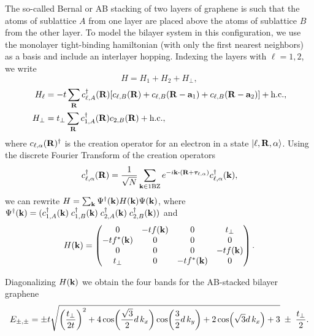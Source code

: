 \documentclass[12pt]{report}
\begin{document}
The so-called Bernal or AB stacking of two layers of graphene is such that the atoms of sublattice $A$ from one layer are placed above the atoms of sublattice $B$ from the other layer.
To model the bilayer system in this configuration, we use the monolayer tight-binding hamiltonian (with only the first
nearest neighbors) as a basis and include an interlayer hopping. Indexing the layers with $\ell = 1, 2$, we write
\begin{equation} \label{eq:ab-hamil}
H = H_1 + H_2 + H_{\perp},
\end{equation}
\begin{equation} \label{eq:ab-slg-hamil}
\begin{split}
H_\ell &= -t \sum_{\vb{R}} c_{\ell,A}^\dagger(\vb{R}) [c_{\ell,B}(\vb{R}) + c_{\ell,B}(\vb{R}-\vb{a}_1) + c_{\ell,B}(\vb{R}-\vb{a}_2)] + {\text{h.c.}}, \\
H_\perp &= t_{\perp} \sum_{\vb{R}} c_{1,A}^\dagger(\vb{R}) c_{2,B}(\vb{R}) + {\text{h.c.}},
\end{split}
\end{equation}
where $c_{\ell,\alpha}(\vb{R})^\dagger$ is the creation operator for an electron in a state $\ket{\ell,\vb{R},\alpha}$. Using the discrete Fourier Transform of the creation operators
\begin{equation} \label{eq:ft-creatio}
c_{\ell,\alpha}^\d(\R) = \frac{1}{\sqrt{N}} \sum_{\k\in\text{1BZ}} e^{-i\k\vdot(\R+\bm{\tau}_{\ell,\alpha})} c_{\ell,\alpha}^\d(\k),
\end{equation}
we can rewrite $H = \sum_{{\vb{k}}} \Psi^\dagger({\vb{k}}) H({\vb{k}}) \Psi({\vb{k}})$, where $\Psi^\dagger({\vb{k}}) = (c_{1,A}^\dagger({\vb{k}}) \; c_{1,B}^\dagger({\vb{k}}) \; c_{2,A}^\dagger({\vb{k}}) \; c_{2,B}^\dagger({\vb{k}}))$ and
\begin{equation} \label{eq:ab-momentum_space}
H({\vb{k}}) =
\begin{pmatrix}
0 & -t f({\vb{k}}) & 0 & t_\perp \\
-t f^*({\vb{k}}) & 0 & 0 & 0 \\
0 & 0 & 0 & -t f({\vb{k}}) \\
t_\perp & 0 & -t f^*({\vb{k}}) & 0 \\
\end{pmatrix}.
\end{equation}

Diagonalizing $H({\vb{k}})$ we obtain the four bands for the AB-stacked bilayer graphene
\begin{equation} \label{eq:ab-four_bands}
E_{\pm,\pm} = \pm t
\sqrt{
\qty(\frac{t_\perp}{2t})^2 +
4 \cos(\frac{\sqrt{3}}{2} d \, k_x) \cos(\frac{3}{2} d \, k_y) + 2 \cos(\sqrt{3} d \, k_x) + 3
}
\; \pm \; \frac{t_\perp}{2}.
\end{equation}
\end{document}
